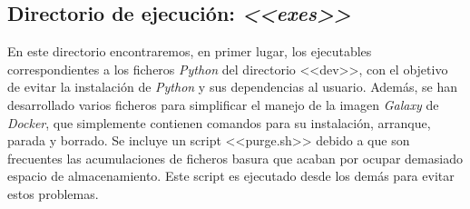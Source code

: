 \subsection{Directorio de ejecución: \textit{<<exes>>}}
En este directorio encontraremos, en primer lugar, los ejecutables correspondientes a los ficheros \textit{Python} del directorio <<dev>>, con el objetivo de evitar la instalación de \textit{Python} y sus dependencias al usuario. Además, se han desarrollado varios ficheros para simplificar el manejo de la imagen \textit{Galaxy} de \textit{Docker}, que simplemente contienen comandos para su instalación, arranque, parada y borrado. Se incluye un script <<purge.sh>> debido a que son frecuentes las acumulaciones de ficheros basura que acaban por ocupar demasiado espacio de almacenamiento. Este script es ejecutado desde los demás para evitar estos problemas.

\newpage \thispagestyle{empty} %